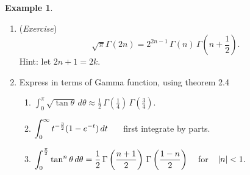 \documentclass[12pt,a4paper]{report}
\theoremstyle{definition}
\newtheorem{exa}[thm]{Example}
\theoremstyle{plain}
\begin{document}
\begin{exa}
\begin{enumerate}
\begin{proof}[Working]
\begin{enumerate}
\item[(ii).] $\begin{aligned}[t]
\sqrt{\pi}\, \Gamma\left(2n + 1\right) & = \frac{2^n\, \Gamma\left(n + \frac{1}{2}\right)\, \Gamma(2n + 1)}{1\cdot 3\cdot 5\, \cdots\, (2n-1)}\hspace{0.4cm}\text{by (i)}\\  
                & = \frac{2^n\, \Gamma\left(n + \frac{1}{2}\right)\, (2n)!}{1\cdot 3\cdot 5\cdot\cdots (2n-1)!}\, , \, \hspace{0.3cm} \Gamma(2n +1) = (2n)!\\   
                & = \frac{\left[(2n)\, (2n-2)\, (2n-4)\, (2n-6)\, \cdots\, 2\, \cdot\, 1\right] 2^n\, \Gamma\left(n+\frac{1}{2}\right)}{1\cdot 3\cdot 5\, \cdots\, (2n-1)}  \\
                & = [2(n)\cdot 2(n-1)\cdot 2(n-2)\cdot 2(n-3)\, \cdots\, 2\, \cdot\, 1]\, 2^n\, \Gamma\left(n+ \frac{1}{2}\right)\\         
                & = 2^n\, \left[n\, (n-1)\, (n-2)\, \cdots\, 2\, \cdot\, 1\right]\, \cdot \, 2^{2n}\, \Gamma\left(n + \frac{1}{2}\right)\\
                & = 2^{2n}\, n!\, \Gamma\left(n + \frac{1}{2}\right)\\
                &  = 2^{2n}\, \Gamma(n+1)\, \Gamma\left(n + \frac{1}{2}\right).
              \end{aligned}$\\
\end{enumerate}
\end{proof}


\item[(f).] (\textit{Exercise}) $$\sqrt{\pi}\Gamma(2n) = 2^{2n -1}\, \Gamma(n)\, \Gamma\left(n + \frac{1}{2}\right).$$ Hint: let $2n + 1 = 2k$.

\item[(g).] Express in terms of Gamma function, using theorem 2.4
\begin{enumerate}
\item[(i).] $\displaystyle{\int^{\pi}_0\sqrt{\tan \theta}\, d\theta \approx \frac{1}{2}\, \Gamma\left(\frac{1}{4}\right)\, \Gamma\left(\frac{3}{4}\right).}$\\

\item[(ii).] $\displaystyle{\int_0^{\infty} t^{-\frac{3}{2}} (1 - e^{-t})\, dt}\hspace{0.5cm}$ first integrate by parts.\\

\item[(iii).] $\displaystyle{\int_0^{\frac{\pi}{2}}\tan ^n\theta\, d\theta = \frac{1}{2}\, \Gamma\left(\frac{n +1}{2}\right)\, \Gamma\left(\frac{1 -n}{2}\right)}\hspace{0.3cm}$ for $\, \hspace{0.2cm} |n| < 1.$\\


\end{enumerate}
\end{enumerate}
\end{exa}
\end{document}

